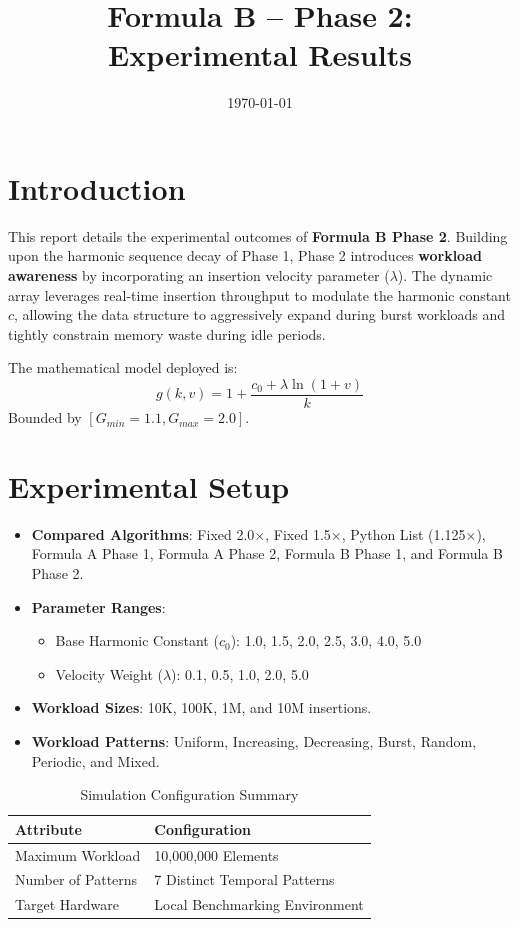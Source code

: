 \documentclass[11pt, a4paper]{article}
\title{Formula B -- Phase 2: Experimental Results}
\author{}
\date{\today}
\begin{document}
\maketitle
\tableofcontents
\listoffigures
\listoftables
\newpage

\section{Introduction}
This report details the experimental outcomes of \textbf{Formula B Phase 2}. Building upon the harmonic sequence decay of Phase 1, Phase 2 introduces \textbf{workload awareness} by incorporating an insertion velocity parameter ($\lambda$). The dynamic array leverages real-time insertion throughput to modulate the harmonic constant $c$, allowing the data structure to aggressively expand during burst workloads and tightly constrain memory waste during idle periods. 

The mathematical model deployed is:
$$ g(k,v) = 1 + \frac{c_0 + \lambda \ln(1+v)}{k} $$
Bounded by $[G_{min}=1.1, G_{max}=2.0]$.

\section{Experimental Setup}
\begin{itemize}
    \item \textbf{Compared Algorithms}: Fixed 2.0$\times$, Fixed 1.5$\times$, Python List (1.125$\times$), Formula A Phase 1, Formula A Phase 2, Formula B Phase 1, and Formula B Phase 2.
    \item \textbf{Parameter Ranges}: 
        \begin{itemize}
            \item Base Harmonic Constant ($c_0$): 1.0, 1.5, 2.0, 2.5, 3.0, 4.0, 5.0
            \item Velocity Weight ($\lambda$): 0.1, 0.5, 1.0, 2.0, 5.0
        \end{itemize}
    \item \textbf{Workload Sizes}: 10K, 100K, 1M, and 10M insertions.
    \item \textbf{Workload Patterns}: Uniform, Increasing, Decreasing, Burst, Random, Periodic, and Mixed.
\end{itemize}

\begin{table}[H]
\centering
\caption{Simulation Configuration Summary}
\begin{tabular}{@{}ll@{}}
\toprule
\textbf{Attribute} & \textbf{Configuration} \\
\midrule
Maximum Workload & 10,000,000 Elements \\
Number of Patterns & 7 Distinct Temporal Patterns \\
Target Hardware & Local Benchmarking Environment \\
\bottomrule
\end{tabular}
\end{table}
\end{document}
